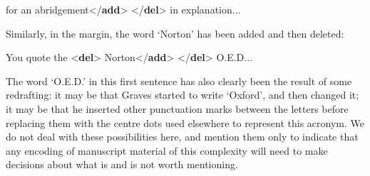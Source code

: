 \begin{shaded}
for an abridgement{</\textbf{add}>}\mbox{}\newline 
{</\textbf{del}>} in explanation...\mbox{}\newline 
\end{shaded}\egroup\par \noindent  Similarly, in the margin, the word ‘Norton’ has been added and then deleted: \par\bgroup{}\exampleFont \begin{shaded}\noindent\mbox{} You\mbox{}\newline 
 quote the {<\textbf{del}>}\mbox{}\newline 
{}Norton{</\textbf{add}>}\mbox{}\newline 
{</\textbf{del}>} O.E.D...\end{shaded}\egroup\par \noindent  The word ‘O.E.D.’ in this first sentence has also clearly been the result of some redrafting: it may be that Graves started to write ‘Oxford’, and then changed it; it may be that he inserted other punctuation marks between the letters before replacing them with the centre dots used elsewhere to represent this acronym. We do not deal with these possibilities here, and mention them only to indicate that any encoding of manuscript material of this complexity will need to make decisions about what is and is not worth mentioning.\par
